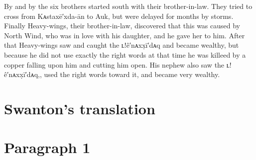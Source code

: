 By and by the six brothers started south with their brother-in-law.
They tried to cross from Kᴀstaxē′xda-ān to Auk, but were delayed for months by storms.
Finally Heavy-wings, their brother-in-law, discovered that this was caused by North Wind, who was in love with his daughter, and he gave her to him.
After that Heavy-wings saw and caught the ʟ!ê′nᴀxx̣ī′dᴀq and became wealthy, but because he did not use exactly the right words at that time he was killeed by a copper falling upon him and cutting him open.
His nephew also saw the ʟ!ê′nᴀxx̣ī′dᴀq,, used the right words toward it, and became very wealthy.

\section{Swanton’s translation}\label{sec:104-swanton-translation}

\section{Paragraph 1}\label{sec:104-para-1}

